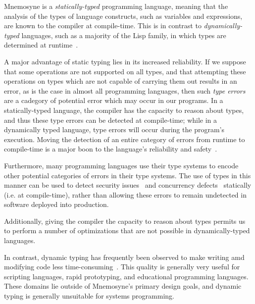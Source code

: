 Mnemosyne is a \textit{statically-typed} programming language, meaning that the analysis of the types of language constructs, such as variables and expressions, are known to the compiler at compile-time. This is in contrast to \textit{dynamically-typed} languages, such as a majority of the Lisp family, in which types are determined at runtime~\cite{Mitchell:2003:TT:1074100.1074885}.

A major advantage of static typing lies in its increased reliability. If we suppose that some operations are not supported on all types, and that attempting these operations on types which are not capable of carrying them out results in an error, as is the case in almost all programming languages, then such \textit{type errors} are a cadegory of potential error which may occur in our programs. In a statically-typed language, the compiler has the capacity to reason about types, and thus these type errors can be detected at compile-time; while in a dynamically typed language, type errors will occur during the program's execution. Moving the detection of an entire category of errors from runtime to compile-time is a major boon to the language's reliability and safety~\cite{Mitchell:2003:TT:1074100.1074885,Mayer:2012:ESI:2398857.2384666}.

Furthermore, many programming languages use their type systems to encode other potential categories of errors in their type systems. The use of types in this manner can be used to detect security issues~\cite{Skalka:2000:SES:357766.351244} and concurrency defects~\cite{Sagonas:2010:USA:2175429.2175432} statically (i.e. at compile-time), rather than allowing these errors to remain undetected in software deployed into production.

Additionally, giving the compiler the capacity to reason about types permits us to perform a number of optimizations that are not possible in dynamically-typed languages.

In contrast, dynamic typing has frequently been observed to make writing amd modifying code less time-consuming~\cite{Mayer:2012:ESI:2398857.2384666,}. This quality is generally very useful for scripting languages, rapid prototyping, and educational programming languages. These domains lie outside of Mnemosyne's primary design goals, and dynamic typing is generally unsuitable for systems programming.


